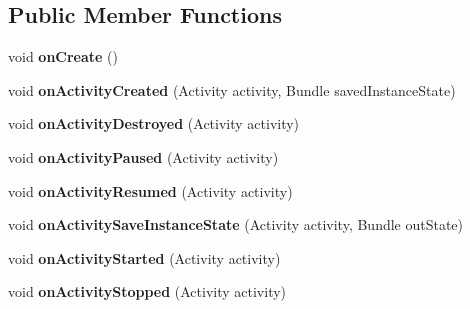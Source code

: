 \subsection*{Public Member Functions}
\begin{DoxyCompactItemize}
\item 
\hypertarget{classcom_1_1spilgames_1_1framework_1_1_spil_application_a4fa171791b7fd07ff9480df3e83daee6}{void {\bfseries on\-Create} ()}\label{classcom_1_1spilgames_1_1framework_1_1_spil_application_a4fa171791b7fd07ff9480df3e83daee6}

\item 
\hypertarget{classcom_1_1spilgames_1_1framework_1_1_spil_application_af54c3b5f12f20987520db3b4646b8608}{void {\bfseries on\-Activity\-Created} (Activity activity, Bundle saved\-Instance\-State)}\label{classcom_1_1spilgames_1_1framework_1_1_spil_application_af54c3b5f12f20987520db3b4646b8608}

\item 
\hypertarget{classcom_1_1spilgames_1_1framework_1_1_spil_application_a9a090979442829bbd31489cfe3c4154b}{void {\bfseries on\-Activity\-Destroyed} (Activity activity)}\label{classcom_1_1spilgames_1_1framework_1_1_spil_application_a9a090979442829bbd31489cfe3c4154b}

\item 
\hypertarget{classcom_1_1spilgames_1_1framework_1_1_spil_application_acfd3de92e6ed07d95a950e4bd8b3a330}{void {\bfseries on\-Activity\-Paused} (Activity activity)}\label{classcom_1_1spilgames_1_1framework_1_1_spil_application_acfd3de92e6ed07d95a950e4bd8b3a330}

\item 
\hypertarget{classcom_1_1spilgames_1_1framework_1_1_spil_application_ad9b6e913e5804d1179a36d297a57bd5d}{void {\bfseries on\-Activity\-Resumed} (Activity activity)}\label{classcom_1_1spilgames_1_1framework_1_1_spil_application_ad9b6e913e5804d1179a36d297a57bd5d}

\item 
\hypertarget{classcom_1_1spilgames_1_1framework_1_1_spil_application_a673922befdab3c6c8647798135fbfba3}{void {\bfseries on\-Activity\-Save\-Instance\-State} (Activity activity, Bundle out\-State)}\label{classcom_1_1spilgames_1_1framework_1_1_spil_application_a673922befdab3c6c8647798135fbfba3}

\item 
\hypertarget{classcom_1_1spilgames_1_1framework_1_1_spil_application_a6e2cc2d3a4fc58d6a025c92268a65dd7}{void {\bfseries on\-Activity\-Started} (Activity activity)}\label{classcom_1_1spilgames_1_1framework_1_1_spil_application_a6e2cc2d3a4fc58d6a025c92268a65dd7}

\item 
\hypertarget{classcom_1_1spilgames_1_1framework_1_1_spil_application_af9474c307f1e11184d73bbd0deee37ec}{void {\bfseries on\-Activity\-Stopped} (Activity activity)}\label{classcom_1_1spilgames_1_1framework_1_1_spil_application_af9474c307f1e11184d73bbd0deee37ec}

\end{DoxyCompactItemize}
